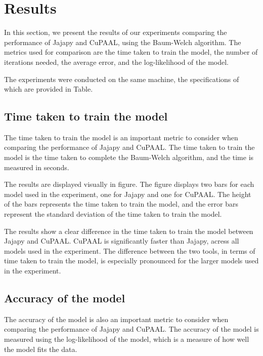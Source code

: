 \section{Results}\label{sec:results}
In this section, we present the results of our experiments comparing the performance of Jajapy and CuPAAL, using the Baum-Welch algorithm.
The metrics used for comparison are the time taken to train the model, the number of iterations needed, the average error, and the log-likelihood of the model.

The experiments were conducted on the same machine, the specifications of which are provided in Table.

\subsection{Time taken to train the model}\label{subsec:results_time}
The time taken to train the model is an important metric to consider when comparing the performance of Jajapy and CuPAAL.
The time taken to train the model is the time taken to complete the Baum-Welch algorithm, and the time is measured in seconds.

The results are displayed visually in figure.
The figure displays two bars for each model used in the experiment, one for Jajapy and one for CuPAAL.
The height of the bars represents the time taken to train the model, and the error bars represent the standard deviation of the time taken to train the model.

The results show a clear difference in the time taken to train the model between Jajapy and CuPAAL.
CuPAAL is significantly faster than Jajapy, acress all models used in the experiment.
The difference between the two tools, in terms of time taken to train the model, is especially pronounced for the larger models used in the experiment.


\subsection{Accuracy of the model}\label{subsec:results_accuracy}
The accuracy of the model is also an important metric to consider when comparing the performance of Jajapy and CuPAAL.
The accuracy of the model is measured using the log-likelihood of the model, which is a measure of how well the model fits the data.
